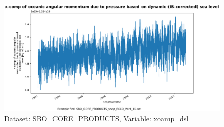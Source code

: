 \begin{figure}[H]
\centering
\includegraphics[scale=0.55]{../images/plots/oneD_plots/SBO_Core_Products/xoamp_dsl.png}
\caption{Dataset: SBO\_CORE\_PRODUCTS, Variable: xoamp\_dsl}
\label{tab:table-SBO_CORE_PRODUCTS_xoamp_dsl-Plot}
\end{figure}
\pagebreak
